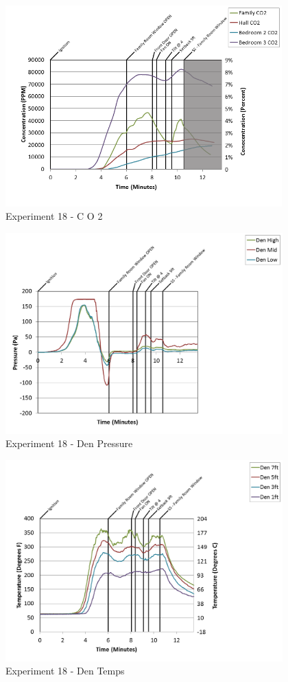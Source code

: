 \documentclass{article}
\begin{document}
\begin{appendices}
\begin{figure}[h!]
	\centering
	\includegraphics[height=3.05in]{0_Images/Results_Charts/Exp_18_Charts/CO2.png}
	\caption{Experiment 18 - C O 2}
\end{figure}

\clearpage

\begin{figure}[h!]
	\centering
	\includegraphics[height=3.05in]{0_Images/Results_Charts/Exp_18_Charts/DenPressure.png}
	\caption{Experiment 18 - Den Pressure}
\end{figure}


\begin{figure}[h!]
	\centering
	\includegraphics[height=3.05in]{0_Images/Results_Charts/Exp_18_Charts/DenTemps.png}
	\caption{Experiment 18 - Den Temps}
\end{figure}


\end{appendices}
\end{document}
